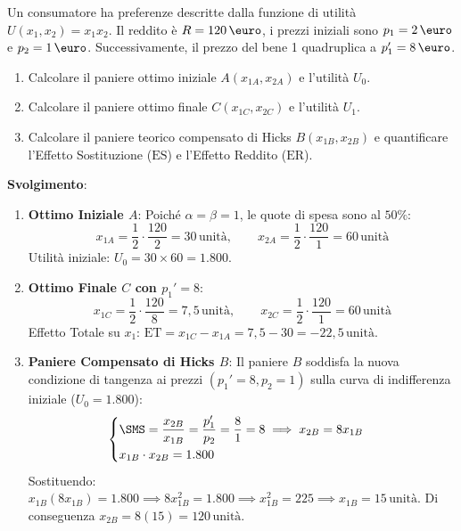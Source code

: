\begin{esercizio}
Un consumatore ha preferenze descritte dalla funzione di utilità $U(x_1, x_2) = x_1 x_2$.
Il reddito è $R = 120\,\text{\euro}$, i prezzi iniziali sono $p_1 = 2\,\text{\euro}$ e $p_2 = 1\,\text{\euro}$.
Successivamente, il prezzo del bene 1 quadruplica a $p_1' = 8\,\text{\euro}$.
\begin{enumerate}
    \item Calcolare il paniere ottimo iniziale $A(x_{1A}, x_{2A})$ e l'utilità $U_0$.
    \item Calcolare il paniere ottimo finale $C(x_{1C}, x_{2C})$ e l'utilità $U_1$.
    \item Calcolare il paniere teorico compensato di Hicks $B(x_{1B}, x_{2B})$ e quantificare l'Effetto Sostituzione ($\text{ES}$) e l'Effetto Reddito ($\text{ER}$).
\end{enumerate}

\textbf{Svolgimento}:
\begin{enumerate}
    \item \textbf{Ottimo Iniziale $A$}:
    Poiché $\alpha = \beta = 1$, le quote di spesa sono al $50\%$:
    \begin{equation}
        x_{1A} = \frac{1}{2} \cdot \frac{120}{2} = 30\,\text{unità}, \qquad x_{2A} = \frac{1}{2} \cdot \frac{120}{1} = 60\,\text{unità}
    \end{equation}
    Utilità iniziale: $U_0 = 30 \times 60 = 1.800$.
    
    \item \textbf{Ottimo Finale $C$ con $p_1' = 8$}:
    \begin{equation}
        x_{1C} = \frac{1}{2} \cdot \frac{120}{8} = 7{,}5\,\text{unità}, \qquad x_{2C} = \frac{1}{2} \cdot \frac{120}{1} = 60\,\text{unità}
    \end{equation}
    Effetto Totale su $x_1$: $\text{ET} = x_{1C} - x_{1A} = 7{,}5 - 30 = -22{,}5\,\text{unità}$.
    
    \item \textbf{Paniere Compensato di Hicks $B$}:
    Il paniere $B$ soddisfa la nuova condizione di tangenza ai prezzi $(p_1'=8, p_2=1)$ sulla curva di indifferenza iniziale ($U_0 = 1.800$):
    \begin{equation}
        \begin{cases}
            \SMS = \dfrac{x_{2B}}{x_{1B}} = \dfrac{p_1'}{p_2} = \dfrac{8}{1} = 8 \implies x_{2B} = 8 x_{1B} \\[0.6em]
            x_{1B} \cdot x_{2B} = 1.800
        \end{cases}
    \end{equation}
    Sostituendo: $x_{1B} (8 x_{1B}) = 1.800 \implies 8 x_{1B}^2 = 1.800 \implies x_{1B}^2 = 225 \implies x_{1B} = 15\,\text{unità}$.
    Di conseguenza $x_{2B} = 8(15) = 120\,\text{unità}$.
    

\end{enumerate}
\end{esercizio}
